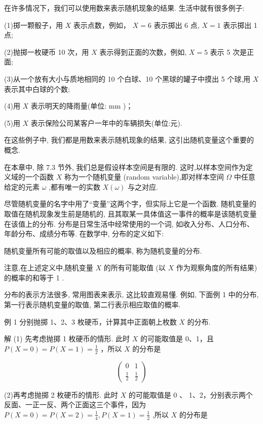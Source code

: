 \documentclass[10pt]{article}
\begin{document}
在许多情况下，我们可以使用数来表示随机现象的结果. 生活中就有很多例子:

(1)掷一颗骰子，用 \(X\) 表示点数，例如， \(X = 6\) 表示掷出 6 点, \(X = 1\) 表示掷出 1 点;

(2)抛掷一枚硬币 10 次，用 \(X\) 表示得到正面的次数，例如, \(X = 5\) 表示 5 次是正面;

(3)从一个放有大小与质地相同的 10 个白球、10 个黑球的罐子中摸出 5 个球,用 \(X\) 表示其中白球的个数;

(4)用 \(X\) 表示明天的降雨量(单位: \(\mathrm{{mm}}\) )；

(5)用 \(X\) 表示保险公司某客户一年中的车辆损失(单位:元).

在这些例子中, 我们都是用数来表示随机现象的结果, 这引出随机变量这个重要的概念.

在本章中, 除 7.3 节外, 我们总是假设样本空间是有限的. 这时,以样本空间作为定义域的一个函数 \(X\) 称为一个随机变量 (random variable),即对样本空间 \(\Omega\) 中任意给定的元素 \(\omega\) ,都有唯一的实数 \(X\left( \omega \right)\) 与之对应.

尽管随机变量的名字中用了“变量”这两个字，但实际上它是一个函数. 随机变量的取值在随机现象发生前是随机的, 且其取某一具体值这一事件的概率是该随机变量在该值上的分布. 分布是日常生活中经常使用的一个词, 如收入分布、人口分布、年龄分布、成绩分布等. 在数学中, 分布的定义如下:

随机变量所有可能的取值以及相应的概率, 称为随机变量的分布.

注意,在上述定义中,随机变量 \(X\) 的所有可能取值 (以 \(X\) 作为观察角度的所有结果)的概率的和等于 1 .





分布的表示方法很多, 常用图表来表示, 这比较直观易懂. 例如, 下面例 1 中的分布, 第一行表示随机变量的取值, 第二行表示相应取值的概率.

例 1 分别抛掷 1、2、3 枚硬币，计算其中正面朝上枚数 \(X\) 的分布.

解 (1) 先考虑抛掷 1 枚硬币的情形. 此时 \(X\) 的可能取值是 0、1，且 \(P\left( {X = 0}\right)  = P\left( {X = 1}\right)  = \frac{1}{2}\) ，所以 \(X\) 的分布是

\[
\left( \begin{matrix} 0 & 1 \\  \frac{1}{2} & \frac{1}{2} \end{matrix}\right)
\]

(2)再考虑抛掷 2 枚硬币的情形. 此时 \(X\) 的可能取值是 0 、 1、2，分别表示两个反面、一正一反、两个正面这三个事件，因为 \(P\left( {X = 0}\right)  = P\left( {X = 2}\right)  = \frac{1}{4},P\left( {X = 1}\right)  = \frac{1}{2}\) ,所以 \(X\) 的分布是
\end{document}
